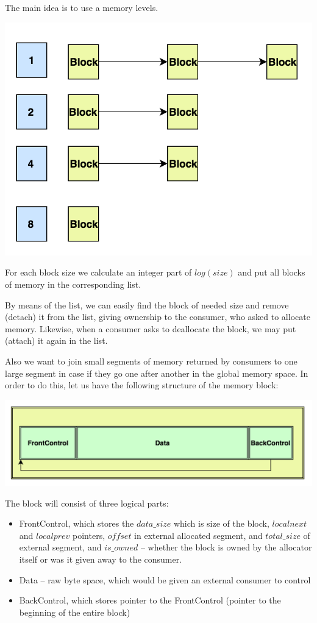 \documentclass{article}
\begin{document}
The main idea is to use a memory levels.

\begin{center}\includegraphics[width=0.5 \textwidth]{image1.png}\end{center}

For each block size we calculate an integer part of $log(size)$ and put all blocks of memory in the corresponding list.

By means of the list, we can easily find the block of needed size and remove (detach) it from the list, giving ownership to the consumer, who asked to allocate memory. Likewise, when a consumer asks to deallocate the block, we may put (attach) it again in the list.

Also we want to join small segments of memory returned by consumers to one large segment in case if they go one after another in the global memory space. In order to do this, let us have the following structure of the memory block:

\begin{center}\includegraphics[width=0.5 \textwidth]{image2.png}\end{center}

The block will consist of three logical parts:
\begin{itemize}
\item FrontControl, which stores the $data\_size$ which is size of the block, $localnext$ and $localprev$ pointers, $offset$ in external allocated segment, and $total\_size$ of external segment, and $is\_owned$ -- whether the block is owned by the allocator itself or was it given away to the consumer.
\item Data -- raw byte space, which would be given an external consumer to control
\item BackControl, which stores pointer to the FrontControl (pointer to the beginning of the entire block)
\end{itemize}
\end{document}
